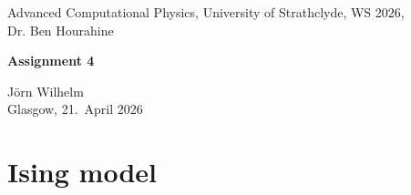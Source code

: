 \documentclass[english, 10pt,a4paper,oneside,headinclude,footinclude,BCOR5mm]{scrartcl}
\begin{document}
\renewcommand{\sectionmark}[1]{\markright{\spacedlowsmallcaps{#1}}} 
\lehead{\mbox{\llap{\small\thepage\kern1em\color{halfgray} \vline}\color{halfgray}\hspace{0.5em}\rightmark\hfil}} 
\pagestyle{plain} 


\begin{center}
    \large Advanced Computational Physics, University of Strathclyde, WS 2026,\\ Dr. Ben Hourahine

    \vspace{0.5cm}

    {\LARGE\bfseries Assignment 4\par}

    \vspace{0.5cm}

    \large Jörn Wilhelm\\
    Glasgow, 21.\ April 2026

    \vspace{1cm}
\end{center}

\newcommand{\cancelblue}[2]{
  \textcolor{blue}{\cancelto{#1}{\textcolor{black}{#2}}}
}
\newcommand{\overblue}[2]{
  \textcolor{blue}{\overbrace{\textcolor{black}{#2}}^{#1}}
}
\newcommand{\underblue}[2]{
  \textcolor{blue}{\underbrace{\textcolor{black}{#2}}_{#1}}
}
\newcommand{\blue}[1]{\textcolor{blue}{#1}}
\newcommand{\red}[1]{\textcolor{red}{#1}}

\section{Ising model}
\end{document}
